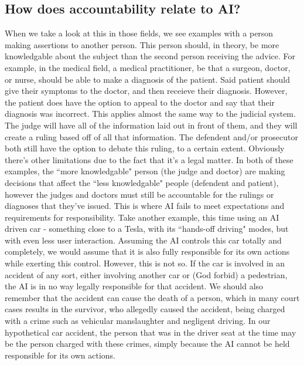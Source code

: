 \documentclass[12pt]{article}
\begin{document}
    \subsection{How does accountability relate to AI?}
    When we take a look at this in those fields, we see examples with a person making assertions to
    another person. This person should, in theory, be more knowledgable about the subject than the 
    second person receiving the advice. For example, in the medical field, a medical practitioner,
    be that a surgeon, doctor, or nurse, should be able to make a diagnosis of the patient. Said
    patient should give their symptoms to the doctor, and then receieve their diagnosis. However,
    the patient does have the option to appeal to the doctor and say that their diagnosis was
    incorrect. This applies almost the same way to the judicial system. The judge will have all
    of the information laid out in front of them, and they will create a ruling based off of all
    that information. The defendent and/or prosecutor both still have the option to debate this
    ruling, to a certain extent. Obviously there's other limitations due to the fact that it's a
    legal matter. In both of these examples, the ``more knowledgable" person (the judge and doctor)
    are making decisions that affect the ``less knowledgable" people (defendent and patient),
    however the judges and doctors must still be accountable for the rulings or diagnoses that
    they've issued. This is where AI fails to meet expectations and requirements for responsibility.
    Take another example, this time using an AI driven car - something close to a Tesla, with its
    ``hands-off driving" modes, but with even less user interaction. Assuming the AI controls this
    car totally and completely, we would assume that it is also fully responsible for its own
    actions while exerting this control. However, this is not so. If the car is involved in an
    accident of any sort, either involving another car or (God forbid) a pedestrian, the AI is in
    no way legally responsible for that accident. We should also remember that the accident can
    cause the death of a person, which in many court cases results in the survivor, who allegedly
    caused the accident, being charged with a crime such as vehicular manslaughter and negligent
    driving. In our hypothetical car accident, the person that was in the driver seat at the time
    may be the person charged with these crimes, simply because the AI cannot be held responsible
    for its own actions.
\end{document}
